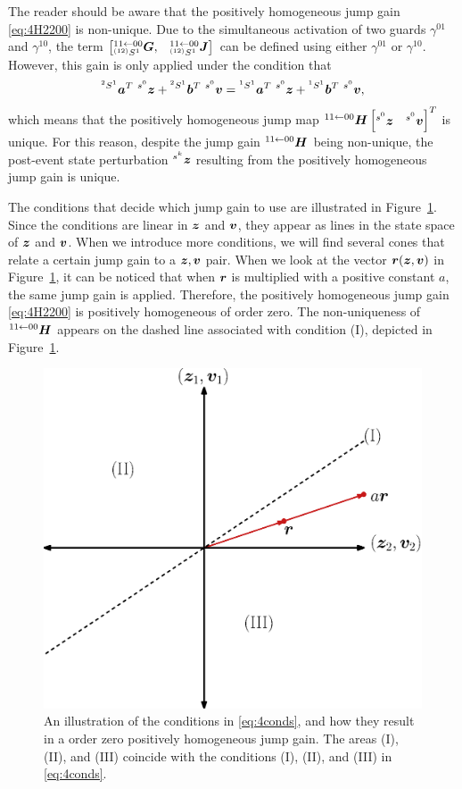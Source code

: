 \documentclass[../DC2019003Bouma.tex]{subfiles}
\begin{document}
The reader should be aware that the positively homogeneous jump gain \eqref{eq:4H2200} is non-unique. Due to the simultaneous activation of two guards $\gamma^{01}$ and $\gamma^{10}$, the term $\begin{bmatrix}\hspace{0cm}^{11\leftarrow 00}_{\hspace{0cm}^{(12)}S^1}{\boldsymbol{G}}, & \hspace{0cm}^{11\leftarrow 00}_{\hspace{0cm}^{(12)}S^1}{\boldsymbol{J}}\end{bmatrix}$ can be defined using either $\gamma^{01}$ or $\gamma^{10}$. However, this gain is only applied under the condition that 
\begin{align}
\hspace{0cm}^{^2 S^1}{\boldsymbol{a}}^T\ \hspace{0cm}^{s^0}{\boldsymbol{z}} +\hspace{0cm}^{^2 S^1}{\boldsymbol{b}}^T\ \hspace{0cm}^{s^0}{\boldsymbol{v}} = \hspace{0cm}^{^1 S^1}{\boldsymbol{a}}^T\ \hspace{0cm}^{s^0}{\boldsymbol{z}} +\hspace{0cm}^{^1 S^1}{\boldsymbol{b}}^T\ \hspace{0cm}^{s^0}{\boldsymbol{v}},
\end{align}
which means that the positively homogeneous jump map $\hspace{0cm}^{11\leftarrow 00}{\boldsymbol{H}}\begin{bmatrix}\hspace{0cm}^{s^0}{\boldsymbol{z}} & \hspace{0cm}^{s^0}{\boldsymbol{v}} \end{bmatrix}^T$ is unique. For this reason, despite the jump gain $\hspace{0cm}^{11\leftarrow 00}{\boldsymbol{H}}$ being non-unique, the post-event state perturbation $\hspace{0cm}^{s^k}{\boldsymbol{z}}$ resulting from the positively homogeneous jump gain is unique. 

The conditions that decide which jump gain to use are illustrated in Figure~\ref{fig:4cone}. Since the conditions are linear in ${\boldsymbol{z}}$ and ${\boldsymbol{v}}$, they appear as lines in the state space of ${\boldsymbol{z}}$ and ${\boldsymbol{v}}$. When we introduce more conditions, we will find several cones that relate a certain jump gain to a ${\boldsymbol{z}},{\boldsymbol{v}}$ pair. When we look at the vector ${\boldsymbol{r}}({\boldsymbol{z}},{\boldsymbol{v}})$ in Figure~\ref{fig:4cone}, it can be noticed that when ${\boldsymbol{r}}$ is multiplied with a positive constant $a$, the same jump gain is applied. Therefore, the positively homogeneous jump gain \eqref{eq:4H2200} is positively homogeneous of order zero. The non-uniqueness of $\hspace{0cm}^{11\leftarrow 00}{\boldsymbol{H}}$ appears on the dashed line associated with condition (I), depicted in Figure~\ref{fig:4cone}.

\begin{figure}[bt!]
\centering
\includegraphics[width=.5\textwidth]{4cone.eps}\caption{An illustration of the conditions in \eqref{eq:4conds}, and how they result in a order zero positively homogeneous jump gain. The areas \textnormal{(I)}, \textnormal{(II)}, and \textnormal{(III)} coincide with the conditions \textnormal{(I)}, \textnormal{(II)}, and \textnormal{(III)} in \eqref{eq:4conds}.}\label{fig:4cone}
\end{figure}
\end{document}
